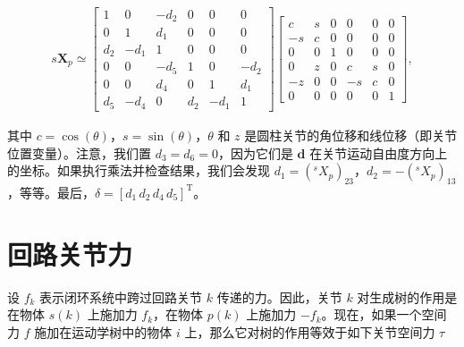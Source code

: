 \documentclass[10pt,a4paper]{book}
\theoremstyle{thmstyle} %
\theoremstyle{defstyle} %
\theoremstyle{prostyle} %
\begin{document}
$$
\begin{array}{r} { s \mathbf { X } _ { p } \simeq \left[ \begin{array}{llllll} { 1 } & { 0 } & { - d _ { 2 } } & { 0 } & { 0 } & { 0 } \\{ 0 } & { 1 } & { d _ { 1 } } & { 0 } & { 0 } & { 0 } \\{ d _ { 2 } } & { - d _ { 1 } } & { 1 } & { 0 } & { 0 } & { 0 } \\{ 0 } & { 0 } & { - d _ { 5 } } & { 1 } & { 0 } & { - d _ { 2 } } \\{ 0 } & { 0 } & { d _ { 4 } } & { 0 } & { 1 } & { d _ { 1 } } \\{ d _ { 5 } } & { - d _ { 4 } } & { 0 } & { d _ { 2 } } & { - d _ { 1 } } & { 1 } \end{array} \right] \left[ \begin{array}{llllll} { c } & { s } & { 0 } & { 0 } & { 0 } & { 0 } \\{ - s } & { c } & { 0 } & { 0 } & { 0 } & { 0 } \\{ 0 } & { 0 } & { 1 } & { 0 } & { 0 } & { 0 } \\{ 0 } & { z } & { 0 } & { c } & { s } & { 0 } \\{ - z } & { 0 } & { 0 } & { - s } & { c } & { 0 } \\{ 0 } & { 0 } & { 0 } & { 0 } & { 0 } & { 1 } \end{array} \right] , } \end{array}
$$



其中 $c=\cos(\theta)$，$s=\sin(\theta)$，$\theta$ 和 $z$ 是圆柱关节的角位移和线位移（即关节位置变量）。注意，我们置 $d_{3}=d_{6}=0$，因为它们是 $\mathbf{d}$ 在关节运动自由度方向上的坐标。如果执行乘法并检查结果，我们会发现 $d_{1}=(^{s}X_{p})_{23}$，$d_{2}=-(^{s}X_{p})_{13}$，等等。最后，$\delta=[d_{1}\,d_{2}\,d_{4}\,d_{5}]^{\mathrm{T}}$。



\section{回路关节力}





设 $f_k$ 表示闭环系统中跨过回路关节 $k$ 传递的力。因此，关节 $k$ 对生成树的作用是在物体 $s(k)$ 上施加力 $f_k$，在物体 $p(k)$ 上施加力 $-f_k$。现在，如果一个空间力 $f$ 施加在运动学树中的物体 $i$ 上，那么它对树的作用等效于如下关节空间力 $\tau$
\end{document}
